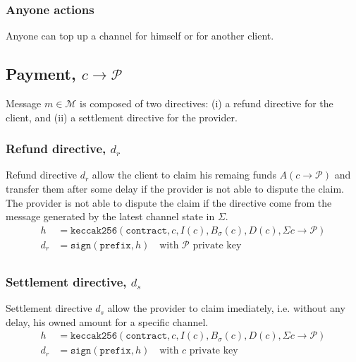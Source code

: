 \documentclass{llncs}
\begin{document}
\subsubsection{Anyone actions} Anyone can top up a channel for himself or for another client.

\subsection{Payment, $c \rightarrow \mathcal{P}$} Message $m \in \mathcal{M}$ is composed of two directives: (i) a refund directive for the client, and (ii) a settlement directive for the provider.

\subsubsection{Refund directive, $d_r$} Refund directive $d_r$ allow the client to claim his remaing funds $A(c \rightarrow \mathcal{P})$ and transfer them after some delay if the provider is not able to dispute the claim. The provider is not able to dispute the claim if the directive come from the message generated by the latest channel state in $\Sigma$.
\begin{equation*}
\begin{split}
    h &= \texttt{keccak256}(\texttt{contract},c,I(c),B_\sigma(c),D(c),\textstyle\Sigma c \rightarrow \mathcal{P}) \\
    d_r &= \texttt{sign}(\texttt{prefix}, h) \quad \text{with $\mathcal{P}$ private key} \\
\end{split}
\end{equation*}

\subsubsection{Settlement directive, $d_s$} Settlement directive $d_s$ allow the provider to claim imediately, i.e. without any delay, his owned amount for a specific channel.
\begin{equation*}
\begin{split}
    h &= \texttt{keccak256}(\texttt{contract},c,I(c),B_\sigma(c),D(c),\textstyle\Sigma c \rightarrow \mathcal{P}) \\
    d_r &= \texttt{sign}(\texttt{prefix}, h) \quad \text{with $c$ private key} \\
\end{split}
\end{equation*}
\end{document}
